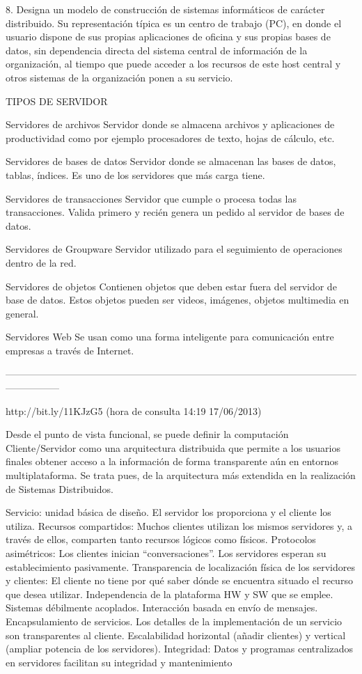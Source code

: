 8. Designa un modelo de construcción de sistemas informáticos de carácter distribuido.
Su representación típica es un centro de trabajo (PC), en donde el usuario dispone de sus propias aplicaciones de oficina y 
sus propias bases de datos, sin dependencia directa del sistema central de información de la organización, al tiempo que puede 
acceder a los recursos de este host central y otros sistemas de la organización ponen a su servicio.


 TIPOS DE SERVIDOR

Servidores de archivos
Servidor donde se almacena archivos y aplicaciones de productividad como por ejemplo procesadores de texto, hojas de cálculo, etc.

Servidores de bases de datos
Servidor donde se almacenan las bases de datos, tablas, índices. Es uno de los servidores que más carga tiene.

Servidores de transacciones
Servidor que cumple o procesa todas las transacciones. Valida primero y recién genera un pedido al servidor de bases de datos.

Servidores de Groupware
Servidor utilizado para el seguimiento de operaciones dentro de la red.

Servidores de objetos
Contienen objetos que deben estar fuera del servidor de base de datos. Estos objetos pueden ser videos, imágenes, 
objetos multimedia en general.

Servidores Web
Se usan como una forma inteligente para comunicación entre empresas a través de Internet.


-----------------------------------------------------------------------------------------------------------------------------

http://bit.ly/11KJzG5 (hora de consulta 14:19 17/06/2013)

Desde el punto de vista funcional, se puede definir la computación Cliente/Servidor como una arquitectura distribuida que permite 
a los usuarios finales obtener acceso a la información de forma transparente aún en entornos multiplataforma. Se trata pues, 
de la arquitectura más extendida en la realización de Sistemas Distribuidos.

Servicio: unidad básica de diseño. El servidor los proporciona y el cliente los utiliza.
Recursos compartidos: Muchos clientes utilizan los mismos servidores y, a través de ellos, comparten tanto recursos lógicos como físicos.
Protocolos asimétricos: Los clientes inician “conversaciones”. Los servidores esperan su establecimiento pasivamente.
Transparencia de localización física de los servidores y clientes: El cliente no tiene por qué saber dónde se encuentra situado el 
recurso que desea utilizar.
Independencia de la plataforma HW y SW que se emplee.
Sistemas débilmente acoplados. Interacción basada en envío de mensajes.
Encapsulamiento de servicios. Los detalles de la implementación de un servicio son transparentes al cliente.
Escalabilidad horizontal (añadir clientes) y vertical (ampliar potencia de los servidores).
Integridad: Datos y programas centralizados en servidores facilitan su integridad y mantenimiento

